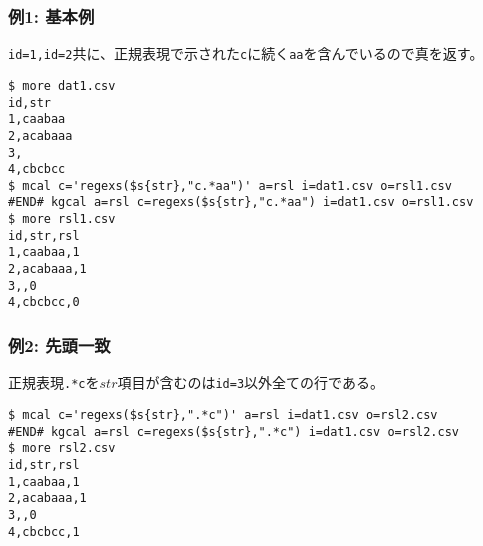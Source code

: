 \subsubsection*{例1: 基本例}

\verb|id=1,id=2|共に、正規表現で示された\verb|c|に続く\verb|aa|を含んでいるので真を返す。


\begin{Verbatim}[baselinestretch=0.7,frame=single]
$ more dat1.csv
id,str
1,caabaa
2,acabaaa
3,
4,cbcbcc
$ mcal c='regexs($s{str},"c.*aa")' a=rsl i=dat1.csv o=rsl1.csv
#END# kgcal a=rsl c=regexs($s{str},"c.*aa") i=dat1.csv o=rsl1.csv
$ more rsl1.csv
id,str,rsl
1,caabaa,1
2,acabaaa,1
3,,0
4,cbcbcc,0
\end{Verbatim}
\subsubsection*{例2: 先頭一致}

正規表現\verb|.*c|を$str$項目が含むのは\verb|id=3|以外全ての行である。


\begin{Verbatim}[baselinestretch=0.7,frame=single]
$ mcal c='regexs($s{str},".*c")' a=rsl i=dat1.csv o=rsl2.csv
#END# kgcal a=rsl c=regexs($s{str},".*c") i=dat1.csv o=rsl2.csv
$ more rsl2.csv
id,str,rsl
1,caabaa,1
2,acabaaa,1
3,,0
4,cbcbcc,1
\end{Verbatim}
